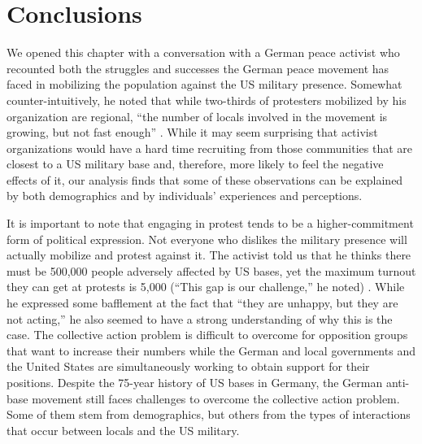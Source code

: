 \section*{Conclusions}



We opened this chapter with a conversation with a German peace activist who recounted both the struggles and successes the German peace movement has faced in mobilizing the population against the US military presence. Somewhat counter-intuitively, he noted that while two-thirds of protesters mobilized by his organization are regional, ``the number of locals involved in the movement is growing, but not fast enough'' \cite{berlinone20190723}. While it may seem surprising that activist organizations would have a hard time recruiting from those communities that are closest to a US military base and, therefore, more likely to feel the negative effects of it, our analysis finds that some of these observations can be explained by both demographics and by individuals' experiences and perceptions.    


It is important to note that engaging in protest tends to be a higher-commitment form of political expression. Not everyone who dislikes the military presence will actually mobilize and protest against it.  The activist told us that he thinks there must be 500,000 people adversely affected by US bases, yet the maximum turnout they can get at protests is 5,000 (``This gap is our challenge,'' he noted) \cite{berlinone20190723}. While he expressed some bafflement at the fact that ``they are unhappy, but they are not acting,'' he also seemed to have a strong understanding of why this is the case. The collective action problem is difficult to overcome for opposition groups that want to increase their numbers while the German and local governments and the United States are simultaneously working to obtain support for their positions. Despite the 75-year history of US bases in Germany, the German anti-base movement still faces challenges to overcome the collective action problem. Some of them stem from demographics, but others from the types of interactions that occur between locals and the US military.

